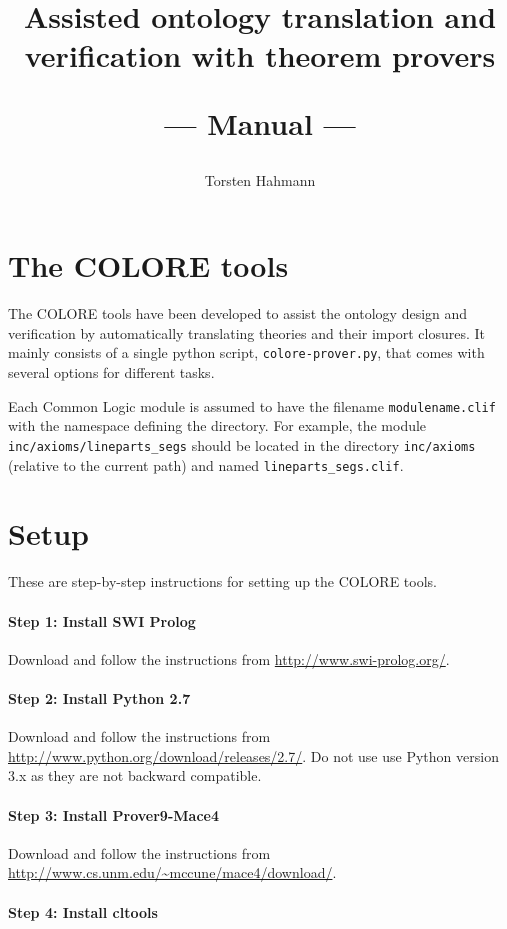 \documentclass{article}
\title{Assisted ontology translation and verification with theorem provers\\
\begin{Large}
--- Manual ---
\end{Large}
}
\author{Torsten Hahmann}
\begin{document}
\maketitle

\section{The COLORE tools}

The COLORE tools have been developed to assist the ontology design and verification by automatically translating theories and their import closures. It mainly consists of a single python script, \texttt{colore-prover.py}, that comes with several options for different tasks.

Each Common Logic module is assumed to have the filename \texttt{modulename.clif} with the namespace defining the directory.
For example, the module \texttt{inc/axioms/\allowbreak lineparts\_segs} should be located in the directory \texttt{inc/axioms} (relative to the current path) and named \texttt{lineparts\_segs.clif}.

\section{Setup}

These are step-by-step instructions for setting up the COLORE tools.

\paragraph{Step 1: Install SWI Prolog}
Download and follow the instructions from \url{http://www.swi-prolog.org/}.

\paragraph{Step 2: Install Python 2.7}
Download and follow the instructions from \url{http://www.python.org/download/releases/2.7/}.
Do not use use Python version 3.x as they are not backward compatible.

\paragraph{Step 3: Install Prover9-Mace4}

Download and follow the instructions from \url{http://www.cs.unm.edu/~mccune/mace4/download/}.

\paragraph{Step 4: Install cltools}
\end{document}
